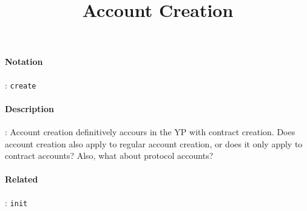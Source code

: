 \documentclass[10pt,a4paper,oneside]{scrartcl}
\title{Account Creation}
\date{}
\begin{document}
\maketitle
\paragraph{Notation}: \texttt{create}
\paragraph{Description}: Account creation definitively accours in the YP with contract creation. Does account creation also apply to regular account creation, or does it only apply to contract accounts? Also, what about protocol accounts?
\paragraph{Related}: \texttt{init}
\par
\end{document}
